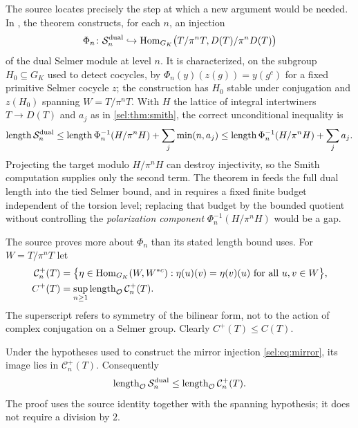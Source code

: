 The source locates precisely the step at which a new argument would be
needed. In , the theorem
 constructs, for each $n$, an
injection
\begin{equation}\label{sel:eq:mirror}
 \Phi_n\colon\mathcal S_n^{\mathrm{dual}}\hookrightarrow
 \operatorname{Hom}_{G_K}\bigl(T/\pi^nT,D(T)/\pi^nD(T)\bigr)
\end{equation}
of the dual Selmer module at level $n$. It is characterized, on the subgroup
$H_0\subseteq G_K$ used to detect cocycles, by
$\Phi_n(y)(z(g))=y(g^c)$ for a fixed primitive Selmer cocycle $z$; the
construction has $H_0$ stable under conjugation and $z(H_0)$ spanning
$W=T/\pi^nT$. With $H$ the lattice of integral intertwiners $T\to D(T)$ and
$a_j$ as in \cref{sel:thm:smith}, the correct unconditional inequality is
\begin{equation}\label{sel:eq:polarcomponent}
 \operatorname{length}\mathcal S_n^{\mathrm{dual}}
 \le\operatorname{length}\Phi_n^{-1}(H/\pi^nH)+\sum_j\min(n,a_j)
 \le\operatorname{length}\Phi_n^{-1}(H/\pi^nH)+\sum_ja_j .
\end{equation}
Projecting the target modulo $H/\pi^nH$ can destroy injectivity, so the
Smith computation supplies only the second term. The theorem in
 feeds the full dual length into the tied Selmer bound,
and  in  requires a fixed finite budget
independent of the torsion level; replacing that budget by the bounded
quotient without controlling the \emph{polarization component}
$\Phi_n^{-1}(H/\pi^nH)$ would be a gap.

The source proves more about $\Phi_n$ than its stated length bound uses.
For $W=T/\pi^nT$ let
\begin{align*}
 \mathcal C_n^+(T)&=\bigl\{\eta\in\operatorname{Hom}_{G_K}(W,W^{*c}):
 \eta(u)(v)=\eta(v)(u)\ \text{for all }u,v\in W\bigr\},\\
 C^+(T)&=\sup_{n\ge1}\operatorname{length}_{\mathcal{O}}\mathcal C_n^+(T).
\end{align*}
The superscript refers to symmetry of the bilinear form, not to the action
of complex conjugation on a Selmer group. Clearly $C^+(T)\le C(T)$.

\begin{proposition}\label{sel:prop:symmetricmirror}
Under the hypotheses used to construct the mirror injection
\eqref{sel:eq:mirror}, its image lies in $\mathcal C_n^+(T)$. Consequently
\[
 \operatorname{length}_{\mathcal{O}}\mathcal S_n^{\mathrm{dual}}\le\operatorname{length}_{\mathcal{O}}\mathcal C_n^+(T).
\]
The proof uses the source identity  together with
the spanning hypothesis; it does not require a division by $2$.
\end{proposition}

